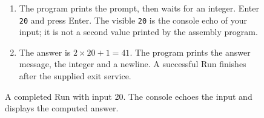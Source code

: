 \begin{figure}[htbp]
  \par\smallskip
  \begin{minipage}{\linewidth}
    \small
    \begin{enumerate}
      \item The program prints the prompt, then waits for an integer. Enter \texttt{20} and press Enter. The visible \texttt{20} is the console echo of your input; it is not a second value printed by the assembly program.
      \item The answer is $2\times20+1=41$. The program prints the answer message, the integer and a newline. A successful Run finishes after the supplied exit service.
    \end{enumerate}
  \end{minipage}
  \caption{A completed Run with input 20. The console echoes the input and displays the computed answer.}
  \label{capture:001-console-calculation-f02-console}
\end{figure}
